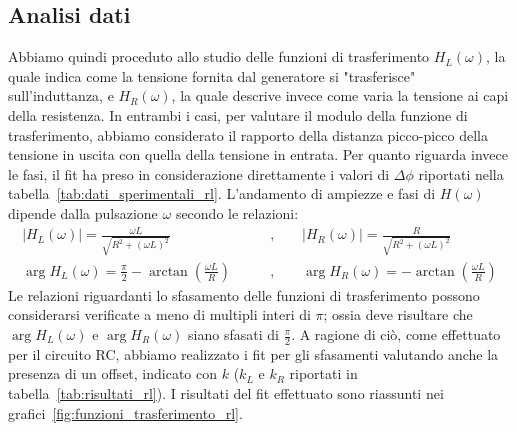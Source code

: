 \documentclass[a4paper]{article}
\begin{document}
\subsection{Analisi dati}
Abbiamo quindi proceduto allo studio delle funzioni di trasferimento $H_L(\omega)$, la quale indica come la tensione fornita dal generatore si "trasferisce" sull'induttanza, e $H_R(\omega)$, la quale descrive invece come varia la tensione ai capi della resistenza. In entrambi i casi, per valutare il modulo della funzione di trasferimento, abbiamo considerato il rapporto della distanza picco-picco della tensione in uscita con quella della tensione in entrata. Per quanto riguarda invece le fasi, il fit ha preso in considerazione direttamente i valori di $\Delta\phi$ riportati nella tabella~\ref{tab:dati_sperimentali_rl}.
L'andamento di ampiezze e fasi di $H(\omega)$ dipende dalla pulsazione $\omega$ secondo le relazioni:
\begin{align}
	 |H_L(\omega)| = \frac{\omega L}{\sqrt{R^2 + (\omega L)^2}} \qquad & \text{,}\qquad |H_R(\omega)| = \frac{R}{\sqrt{R^2 + (\omega L)^2}} \label{eq:ampiezza RL} \\
	 \arg H_L(\omega) = \frac{\pi}{2} - \arctan\left(\frac{\omega L}{R}\right) \qquad & \text{,}\qquad \arg H_R(\omega) = -\arctan\left(\frac{\omega L}{R}\right) \label{eq:fasi RL}
\end{align}
Le relazioni riguardanti lo sfasamento delle funzioni di trasferimento possono considerarsi verificate a meno di multipli interi di $\pi$; ossia deve risultare che $\arg H_L(\omega)$ e $\arg H_R(\omega)$ siano sfasati di $\frac{\pi}{2}$. A ragione di ciò, come effettuato per il circuito RC, abbiamo realizzato i fit per gli sfasamenti valutando anche la presenza di un offset, indicato con $k$ ($k_L$ e $k_R$ riportati in tabella~\ref{tab:risultati_rl}).
I risultati del fit effettuato sono riassunti nei grafici~\ref{fig:funzioni_trasferimento_rl}.
\end{document}
